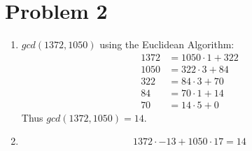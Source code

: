 \documentclass[a4paper,12pt]{extarticle}
\theoremstyle{definition}
\begin{document}
    \section*{Problem 2}\begin{enumerate}[label=(\alph*)]
        \item $gcd(1372,1050)$ using the Euclidean Algorithm:\begin{align*}
            1372&=1050\cdot1+322\\
            1050&=322\cdot3+84\\
            322&=84\cdot3+70\\
            84&=70\cdot1+14\\
            70&=14\cdot5+0
        \end{align*} Thus $gcd(1372,1050)=14$.
        \item $$1372\cdot-13+1050\cdot17=14$$
    \end{enumerate}
\end{document}
